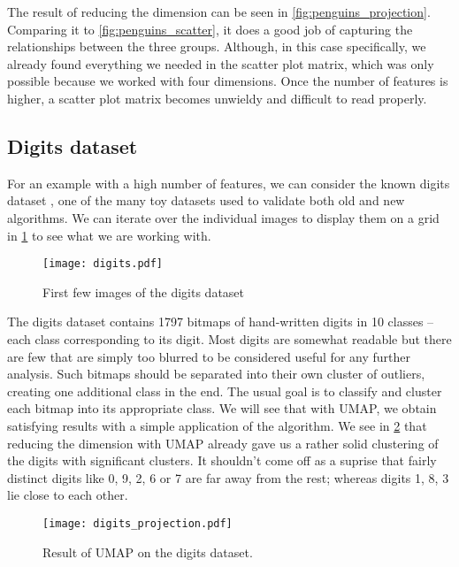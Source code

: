 The result of reducing the dimension can be seen in \ref{fig:penguins_projection}. Comparing it to \ref{fig:penguins_scatter}, it does a good job of capturing the relationships between the three groups. Although, in this case specifically, we already found everything we needed in the scatter plot matrix, which was only possible because we worked with four dimensions. Once the number of features is higher, a scatter plot matrix becomes unwieldy and difficult to read properly.

\subsection{Digits dataset}
For an example with a high number of features, we can consider the known digits dataset \cite{optical_recognition_of_handwritten_digits_80}, one of the many toy datasets used to validate both old and new algorithms. We can iterate over the individual images to display them on a grid in \ref{fig:digits} to see what we are working with.

\begin{figure}[h!]
  \centering
  \texttt{[image: digits.pdf]}
  \caption{First few images of the digits dataset}
  \label{fig:digits}
\end{figure}

The digits dataset contains 1797 bitmaps of hand-written digits in 10 classes -- each class corresponding to its digit. Most digits are somewhat readable but there are few that are simply too blurred to be considered useful for any further analysis. Such bitmaps should be separated into their own cluster of outliers, creating one additional class in the end.
The usual goal is to classify and cluster each bitmap into its appropriate class. We will see that with UMAP, we obtain satisfying results with a simple application of the algorithm. We see in \ref{fig:digits_projection} that reducing the dimension with UMAP already gave us a rather solid clustering of the digits with significant clusters. It shouldn't come off as a suprise that fairly distinct digits like 0, 9, 2, 6 or 7 are far away from the rest; whereas digits 1, 8, 3 lie close to each other.

\begin{figure}[h!]
  \centering
  \texttt{[image: digits\_projection.pdf]}
  \caption{Result of UMAP on the digits dataset.}
  \label{fig:digits_projection}
\end{figure}

